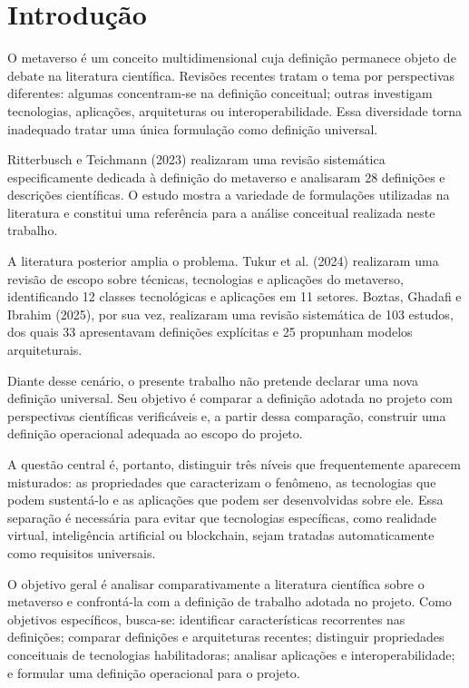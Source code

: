 \chapter{Introdução}
\label{cha:introducao}

O metaverso é um conceito multidimensional cuja definição permanece objeto de debate na literatura científica. Revisões recentes tratam o tema por perspectivas diferentes: algumas concentram-se na definição conceitual; outras investigam tecnologias, aplicações, arquiteturas ou interoperabilidade. Essa diversidade torna inadequado tratar uma única formulação como definição universal.

Ritterbusch e Teichmann (2023) realizaram uma revisão sistemática especificamente dedicada à definição do metaverso e analisaram 28 definições e descrições científicas. O estudo mostra a variedade de formulações utilizadas na literatura e constitui uma referência para a análise conceitual realizada neste trabalho. \cite{ritterbusch2023}

A literatura posterior amplia o problema. Tukur et al. (2024) realizaram uma revisão de escopo sobre técnicas, tecnologias e aplicações do metaverso, identificando 12 classes tecnológicas e aplicações em 11 setores. Boztas, Ghadafi e Ibrahim (2025), por sua vez, realizaram uma revisão sistemática de 103 estudos, dos quais 33 apresentavam definições explícitas e 25 propunham modelos arquiteturais. \cite{tukur2024,boztas2025}

Diante desse cenário, o presente trabalho não pretende declarar uma nova definição universal. Seu objetivo é comparar a definição adotada no projeto com perspectivas científicas verificáveis e, a partir dessa comparação, construir uma definição operacional adequada ao escopo do projeto.

A questão central é, portanto, distinguir três níveis que frequentemente aparecem misturados: as propriedades que caracterizam o fenômeno, as tecnologias que podem sustentá-lo e as aplicações que podem ser desenvolvidas sobre ele. Essa separação é necessária para evitar que tecnologias específicas, como realidade virtual, inteligência artificial ou blockchain, sejam tratadas automaticamente como requisitos universais.

O objetivo geral é analisar comparativamente a literatura científica sobre o metaverso e confrontá-la com a definição de trabalho adotada no projeto. Como objetivos específicos, busca-se: identificar características recorrentes nas definições; comparar definições e arquiteturas recentes; distinguir propriedades conceituais de tecnologias habilitadoras; analisar aplicações e interoperabilidade; e formular uma definição operacional para o projeto.

